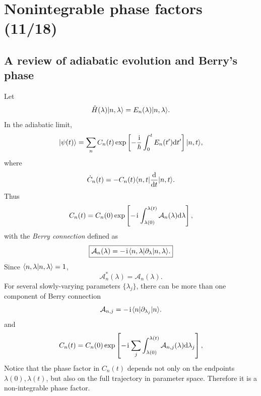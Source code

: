 \section{Nonintegrable phase factors (11/18)}


\subsection{A review of adiabatic evolution and Berry's phase}
Let
\begin{equation}
 \hat H(\lambda)|{n,\lambda}\rangle
 =E_n(\lambda)|{n,\lambda}\rangle.
\end{equation}
In the adiabatic limit,
\begin{equation}
 |{\psi(t)}\rangle
 =\sum_n C_n(t)
 \exp\left[-\frac{\hspace{1pt}\mathrm{i}\hspace{1pt}}{\hbar}
 \int_0^t E_n(t')\mathrm{d} t'\right]
 |{n,t}\rangle,
\end{equation}
where
\begin{equation}
 \dot C_n(t)
 =-C_n(t)\langle{n,t}|\frac{\mathrm{d}}{\mathrm{d} t}|{n,t}\rangle.
\end{equation}
Thus
\begin{equation}
 C_n(t)=C_n(0)
 \exp\left[-\hspace{1pt}\mathrm{i}\hspace{1pt}\int_{\lambda(0)}^{\lambda(t)}
 \mathcal A_n(\lambda)\mathrm{d}\lambda\right],
\end{equation}
with the \emph{Berry connection} defined as
\begin{equation}
 \boxed{
 \mathcal A_n(\lambda)
 =-\hspace{1pt}\mathrm{i}\hspace{1pt}\langle{n,\lambda}|\partial_\lambda|{n,\lambda}\rangle.}
\end{equation}
Since $\langle{n,\lambda|n,\lambda}\rangle=1$,
\begin{equation}
 \mathcal A_n^*(\lambda)=\mathcal A_n(\lambda).
\end{equation}
For several slowly-varying parameters $\{\lambda_j\}$, there can be more than one component of Berry connection 
\begin{equation}
 \mathcal A_{n,j}
 =-\hspace{1pt}\mathrm{i}\hspace{1pt}\langle{n}|\partial_{\lambda_j}|{n}\rangle.
\end{equation}
and 
\begin{equation}
 C_n(t)=C_n(0)
 \exp\left[-\hspace{1pt}\mathrm{i}\hspace{1pt}\sum_j\int_{\lambda(0)}^{\lambda(t)}
 \mathcal A_{n,j}(\lambda)\mathrm{d}\lambda_j\right],
\end{equation}
Notice that the phase factor in $C_n(t)$ depends not only on the endpoints $\lambda(0),\lambda(t)$, but also on the full trajectory in parameter space. Therefore it is a non-integrable phase factor. 

